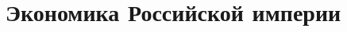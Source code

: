 \documentclass[a4paper,12pt]{article}
\let\oldsection\section
\renewcommand\section{\clearpage\oldsection}
\begin{document}


\section{Экономика Российской империи}\label{sec:economy}

\end{document}
